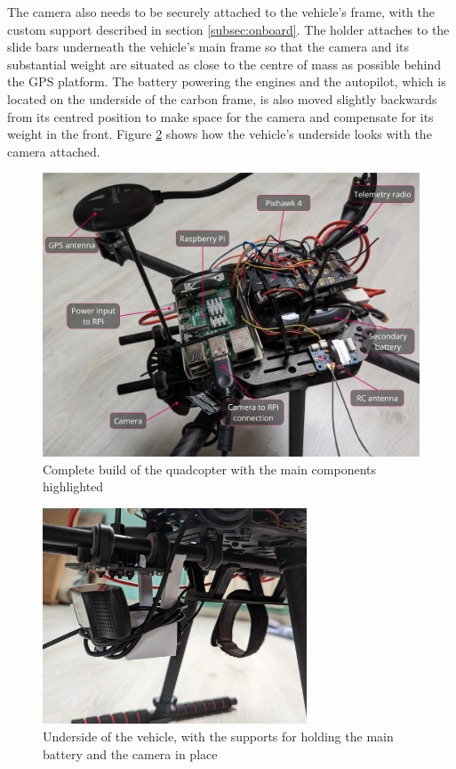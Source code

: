 The camera also needs to be securely attached to the vehicle's frame, with the custom support described in section \ref{subsec:onboard}.
The holder attaches to the slide bars underneath the vehicle's main frame so that the camera and its substantial weight are situated as close to the centre of mass as possible behind the GPS platform.
The battery powering the engines and the autopilot, which is located on the underside of the carbon frame, is also moved slightly backwards from its centred position to make space for the camera and compensate for its weight in the front.
Figure \ref{fig:camera-holder-closeup} shows how the vehicle's underside looks with the camera attached.

\begin{figure}
  \centering
  \includegraphics[width=1\textwidth, keepaspectratio]{img/full-build.jpg}
  \caption{Complete build of the quadcopter with the main components highlighted}\label{fig:full-build}
\end{figure}

\begin{figure}
  \centering
  \includegraphics[width=0.7\textwidth, keepaspectratio]{img/underside-2.jpg}
  \caption{Underside of the vehicle, with the supports for holding the main battery and the camera in place}
  \label{fig:camera-holder-closeup}
\end{figure}


